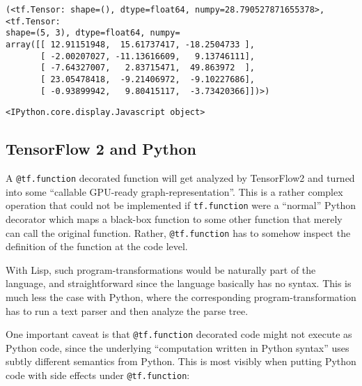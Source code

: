 \documentclass[11pt]{article}
\begin{document}
    \begin{Verbatim}[commandchars=\\\{\}]
(<tf.Tensor: shape=(), dtype=float64, numpy=28.790527871655378>, <tf.Tensor:
shape=(5, 3), dtype=float64, numpy=
array([[ 12.91151948,  15.61737417, -18.2504733 ],
       [ -2.00207027, -11.13616609,   9.13746111],
       [ -7.64327007,   2.83715471,  49.863972  ],
       [ 23.05478418,  -9.21406972,  -9.10227686],
       [ -0.93899942,   9.80415117,  -3.73420366]])>)
    \end{Verbatim}

    
    \begin{Verbatim}[commandchars=\\\{\}]
<IPython.core.display.Javascript object>
    \end{Verbatim}

    
    \hypertarget{tensorflow-2-and-python}{%
\subsection{TensorFlow 2 and Python}\label{tensorflow-2-and-python}}

A \texttt{@tf.function} decorated function will get analyzed by
TensorFlow2 and turned into some ``callable GPU-ready
graph-representation''. This is a rather complex operation that could
not be implemented if \texttt{tf.function} were a ``normal'' Python
decorator which maps a black-box function to some other function that
merely can call the original function. Rather, \texttt{@tf.function} has
to somehow inspect the definition of the function at the code level.

With Lisp, such program-transformations would be naturally part of the
language, and straightforward since the language basically has no
syntax. This is much less the case with Python, where the corresponding
program-transformation has to run a text parser and then analyze the
parse tree.

One important caveat is that \texttt{@tf.function} decorated code might
not execute as Python code, since the underlying ``computation written
in Python syntax'' uses subtly different semantics from Python. This is
most visibly when putting Python code with side effects under
\texttt{@tf.function}:
\end{document}

